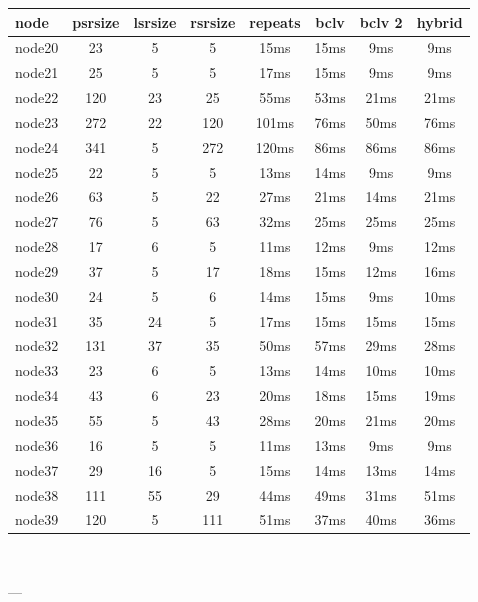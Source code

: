 \begin{tabular}{|l|c|c|c|c|c|c|c|}
\hline node & psrsize & lsrsize & rsrsize   & repeats & bclv & bclv 2 & hybrid\\
    \hline node20 & 23 & 5 & 5 & 15ms & 15ms & 9ms & 9ms\\
    \hline node21 & 25 & 5 & 5 & 17ms & 15ms & 9ms & 9ms\\
    \hline node22 & 120 & 23 & 25 & 55ms & 53ms & 21ms & 21ms\\
    \hline node23 & 272 & 22 & 120 & 101ms & 76ms & 50ms & 76ms\\
    \hline node24 & 341 & 5 & 272 & 120ms & 86ms & 86ms & 86ms\\
    \hline node25 & 22 & 5 & 5 & 13ms & 14ms & 9ms & 9ms\\
    \hline node26 & 63 & 5 & 22 & 27ms & 21ms & 14ms & 21ms\\
    \hline node27 & 76 & 5 & 63 & 32ms & 25ms & 25ms & 25ms\\
    \hline node28 & 17 & 6 & 5 & 11ms & 12ms & 9ms & 12ms\\
    \hline node29 & 37 & 5 & 17 & 18ms & 15ms & 12ms & 16ms\\
    \hline node30 & 24 & 5 & 6 & 14ms & 15ms & 9ms & 10ms\\
    \hline node31 & 35 & 24 & 5 & 17ms & 15ms & 15ms & 15ms\\
    \hline node32 & 131 & 37 & 35 & 50ms & 57ms & 29ms & 28ms\\
    \hline node33 & 23 & 6 & 5 & 13ms & 14ms & 10ms & 10ms\\
    \hline node34 & 43 & 6 & 23 & 20ms & 18ms & 15ms & 19ms\\
    \hline node35 & 55 & 5 & 43 & 28ms & 20ms & 21ms & 20ms\\
    \hline node36 & 16 & 5 & 5 & 11ms & 13ms & 9ms & 9ms\\
    \hline node37 & 29 & 16 & 5 & 15ms & 14ms & 13ms & 14ms\\
    \hline node38 & 111 & 55 & 29 & 44ms & 49ms & 31ms & 51ms\\
    \hline node39 & 120 & 5 & 111 & 51ms & 37ms & 40ms & 36ms\\

\hline
\end{tabular} \

---


